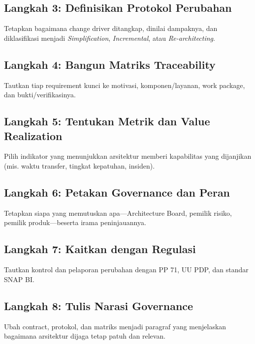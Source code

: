\subsection{Langkah 3: Definisikan Protokol Perubahan}
Tetapkan bagaimana change driver ditangkap, dinilai dampaknya, dan diklasifikasi
menjadi \emph{Simplification}, \emph{Incremental}, atau \emph{Re-architecting}.

\subsection{Langkah 4: Bangun Matriks Traceability}
Tautkan tiap requirement kunci ke motivasi, komponen/layanan, work package, dan
bukti/verifikasinya.

\subsection{Langkah 5: Tentukan Metrik dan Value Realization}
Pilih indikator yang menunjukkan arsitektur memberi kapabilitas yang dijanjikan
(mis. waktu transfer, tingkat kepatuhan, insiden).

\subsection{Langkah 6: Petakan Governance dan Peran}
Tetapkan siapa yang memutuskan apa---Architecture Board, pemilik risiko, pemilik
produk---beserta irama peninjauannya.

\subsection{Langkah 7: Kaitkan dengan Regulasi}
Tautkan kontrol dan pelaporan perubahan dengan PP 71, UU PDP, dan standar SNAP BI.

\subsection{Langkah 8: Tulis Narasi Governance}
Ubah contract, protokol, dan matriks menjadi paragraf yang menjelaskan bagaimana
arsitektur dijaga tetap patuh dan relevan.

